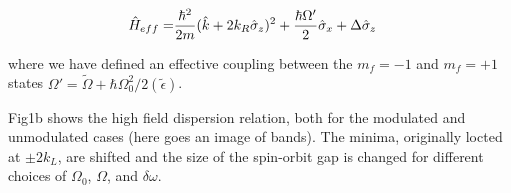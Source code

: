 \begin{align}
	\begin{split}
		\hat{H}_{eff} = & \frac{\hbar^2}{2m}(\hat{k}+2{{k_R}}\hat{\sigma}_z)^2 + \frac{\hbar\Omega'}{2}\hat{\sigma}_x  +\Delta\hat{\sigma}_z  
		\label{Eq:SOChalf}
	\end{split}
\end{align}	

where we have defined an effective coupling between the $m_f=-1$ and $m_f=+1$ states $\Omega'=\tilde{\Omega}+\hbar\Omega_0^2/2(\tilde{\epsilon})$. 


Fig1b shows the high field dispersion relation, both for the modulated and unmodulated cases (here goes an image of bands). The minima, originally locted at $\pm2 k_L$, are shifted and the size of the spin-orbit gap is changed for different choices of $\Omega_0$, $\Omega$, and $\delta\omega$.  








